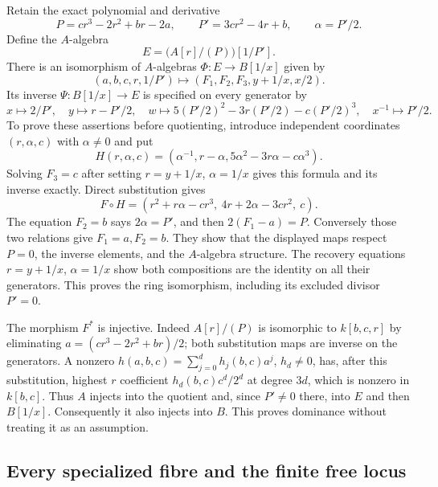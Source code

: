 Retain the exact polynomial and derivative
\[
 P=cr^3-2r^2+br-2a,\qquad P'=3cr^2-4r+b,\qquad \alpha=P'/2.
\]
Define the $A$-algebra
\[
 E=\bigl(A[r]/(P)\bigr)[1/P'].
\]
There is an isomorphism of $A$-algebras $\Phi:E\to B[1/x]$ given by
\[
 (a,b,c,r,1/P')\longmapsto
 (F_1,F_2,F_3,y+1/x,x/2).
\]
Its inverse $\Psi:B[1/x]\to E$ is specified on every generator by
\[
 x\longmapsto 2/P',\quad
 y\longmapsto r-P'/2,\quad
 w\longmapsto 5(P'/2)^2-3r(P'/2)-c(P'/2)^3,
 \quad x^{-1}\longmapsto P'/2.
\]
To prove these assertions before quotienting, introduce independent
coordinates $(r,\alpha,c)$ with $\alpha\ne0$ and put
\[
 H(r,\alpha,c)=
 \left(\alpha^{-1},r-\alpha,5\alpha^2-3r\alpha-c\alpha^3\right).
\]
Solving $F_3=c$ after setting $r=y+1/x$, $\alpha=1/x$ gives this
formula and its inverse exactly. Direct substitution gives
\[
 F\circ H=(r^2+r\alpha-cr^3,\ 4r+2\alpha-3cr^2,\ c).
\]
The equation $F_2=b$ says $2\alpha=P'$, and then
$2(F_1-a)=P$. Conversely those two relations give $F_1=a,F_2=b$.
They show that the displayed maps respect $P=0$, the inverse elements,
and the $A$-algebra structure. The recovery equations
$r=y+1/x$, $\alpha=1/x$ show both compositions are the identity on
all their generators. This proves the ring isomorphism, including its
excluded divisor $P'=0$.

The morphism $F^*$ is injective. Indeed $A[r]/(P)$ is isomorphic to
$k[b,c,r]$ by eliminating $a=(cr^3-2r^2+br)/2$; both substitution maps
are inverse on the generators. A nonzero
$h(a,b,c)=\sum_{j=0}^d h_j(b,c)a^j$, $h_d\ne0$, has, after this
substitution, highest $r$ coefficient $h_d(b,c)c^d/2^d$ at degree $3d$,
which is nonzero in $k[b,c]$. Thus $A$ injects into the quotient and,
since $P'\ne0$ there, into $E$ and then $B[1/x]$. Consequently it
also injects into $B$. This proves dominance without treating it as an
assumption.

\subsection{Every specialized fibre and the finite free locus}

